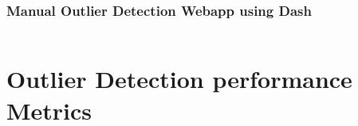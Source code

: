 
\subsubsection{Manual Outlier Detection Webapp using Dash}
\inputminted[linenos]{python}{./code/manual_outlier_detection.py}

\section{Outlier Detection performance Metrics}
